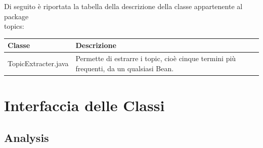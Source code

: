 \documentclass[11pt]{article}
\begin{document}
			\begin{description}
				\item Di seguito è riportata la tabella della descrizione della classe appartenente al package\\topics:
				\item \begin{tabular}{|p{}|p{}|}
					\hline
					\textbf{Classe} & \textbf{Descrizione}\\
					\hline
					TopicExtracter.java & Permette di estrarre i topic, cioè cinque termini più frequenti, da un qualsiasi Bean. \\
					\hline
				\end{tabular}
			\end{description}
	
\newpage			
	\section{Interfaccia delle Classi}	
		\subsection{Analysis}
	
	
\end{document}
